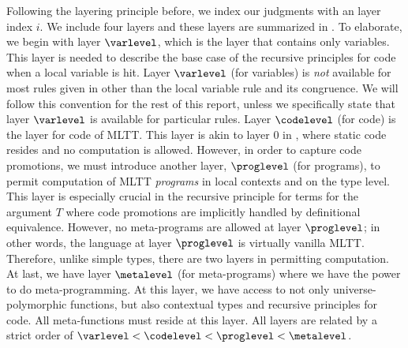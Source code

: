 Following the layering principle before, we index our judgments with an layer index
$i$. %
We include four layers and these layers are summarized in . %
To elaborate, we begin with layer $\varlevel$, which is the layer that contains only
variables. %
This layer is needed to describe the base case of the recursive principles for code
when a local variable is hit. %
Layer $\varlevel$ (for variables) is \emph{not} available for most rules given in
 other than the local variable rule and its congruence. %
We will follow this convention for the rest of this report, unless we specifically
state that layer $\varlevel$ is available for particular rules. %
Layer $\codelevel$ (for code) is the layer for code of MLTT. %
This layer is akin to layer $0$ in , where static code
resides and no computation is allowed. %
However, in order to capture code promotions, we must introduce another layer, $\proglevel$ (for
programs), to permit computation of MLTT \emph{programs} in local contexts and on the
type level. %
This layer is especially crucial in the recursive principle for terms for the argument
$T$ where code promotions are implicitly handled by definitional equivalence. %
However, no meta-programs are allowed at layer $\proglevel$; in other words, the language at
layer $\proglevel$ is virtually vanilla MLTT. %
Therefore, unlike simple types, there are two layers in \delamlang permitting
computation. %
At last, we have layer $\metalevel$ (for meta-programs) where we have the power to do
meta-programming. %
At this layer, we have access to not only universe-polymorphic functions, but also
contextual types and recursive principles for code. %
All meta-functions must reside at this layer. %
All layers are related by a strict order of $\varlevel < \codelevel < \proglevel < \metalevel$. %

